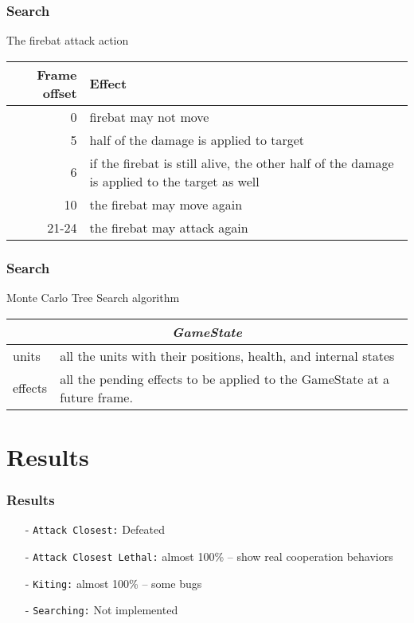 \documentclass{beamer}
\begin{document}
\begin{frame}
\frametitle{Search}
The firebat attack action
\begin{center}
\begin{tabular}{ r | p{} }
Frame offset & Effect \\
\hline
0 & firebat may not move \\
5 & half of the damage is applied to target \\
6 & if the firebat is still alive, the other half of the damage is applied to the target as well \\
10 & the firebat may move again \\
21-24 & the firebat may attack again
\end{tabular}
\end{center}
\end{frame}

\begin{frame}
\frametitle{Search}
Monte Carlo Tree Search algorithm

\begin{center}
\begin{tabular}{ | l | p{} | }
\hline
\multicolumn{2}{|c|}{\emph{GameState}} \\
\hline
units		& all the units with their positions, health, and internal states \\
effects	& all the pending effects to be applied to the GameState at a future frame. \\
\hline
\end{tabular}
\end{center}
\end{frame}

\section{Results}

\begin{frame}
\frametitle{Results}
\begin{itemize}
\item[-] \texttt{Attack Closest:} Defeated
\item[-] \texttt{Attack Closest Lethal:} almost 100\% -- show real cooperation behaviors
\item[-] \texttt{Kiting:} almost 100\% -- some bugs
\item[-] \texttt{Searching:} Not implemented
\end{itemize}
\end{frame}
\end{document}
